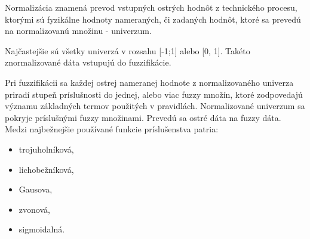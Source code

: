 Normalizácia znamená prevod vstupných ostrých hodnôt z technického procesu, ktorými sú fyzikálne hodnoty  nameraných, či zadaných hodnôt, ktoré sa prevedú na normalizovanú množinu - univerzum. 

Najčastejšie sú všetky univerzá v rozsahu [-1;1] alebo [0, 1]. Takéto znormalizované dáta vstupujú do fuzzifikácie. 

Pri fuzzifikácii sa každej ostrej nameranej hodnote z normalizovaného univerza priradí stupeň príslušnosti do jednej, alebo viac fuzzy množín, ktoré zodpovedajú významu základných termov použitých v pravidlách. 
Normalizované univerzum sa pokryje príslušnými fuzzy množinami. Prevedú sa ostré dáta na fuzzy dáta. Medzi najbežnejšie používané funkcie príslušenstva patria: 
\begin{itemize}
\item trojuholníková, 
\item lichobežníková, 
\item Gausova, 
\item zvonová, 
\item sigmoidalná. 
\end{itemize}


  




































